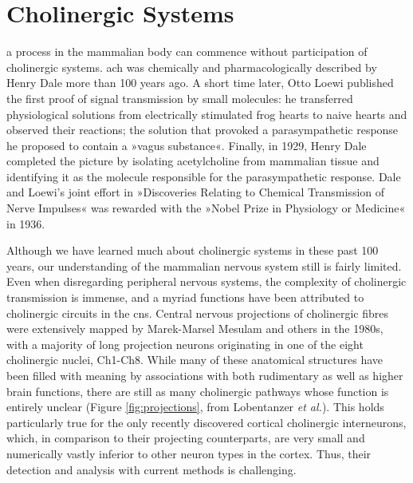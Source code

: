 \section{Cholinergic Systems}
 a process in the mammalian body can commence without participation of cholinergic systems. \Ac{ach} was chemically and pharmacologically described by Henry Dale more than 100 years ago.\cite{Dale1914} A short time later, Otto Loewi published the first proof of signal transmission by small molecules: he transferred physiological solutions from electrically stimulated frog hearts to naive hearts and observed their reactions; the solution that provoked a parasympathetic response he proposed to contain a »vagus substance«.\cite{Loewi1921} Finally, in 1929, Henry Dale completed the picture by isolating acetylcholine from mammalian tissue and identifying it as the molecule responsible for the parasympathetic response.\cite{Dale1929} Dale and Loewi's joint effort in »Discoveries Relating to Chemical Transmission of Nerve Impulses« was rewarded with the »Nobel Prize in Physiology or Medicine« in 1936.

Although we have learned much about cholinergic systems in these past 100 years, our understanding of the mammalian nervous system still is fairly limited. Even when disregarding peripheral nervous systems, the complexity of cholinergic transmission is immense, and a myriad functions have been attributed to cholinergic circuits in the \ac{cns}. Central nervous projections of cholinergic fibres were extensively mapped by Marek-Marsel Mesulam and others in the 1980s,\cite{Mesulam1984, Mesulam1988} with a majority of long projection neurons originating in one of the eight cholinergic nuclei, Ch1-Ch8. While many of these anatomical structures have been filled with meaning by associations with both rudimentary as well as higher brain functions, there are still as many cholinergic pathways whose function is entirely unclear (Figure \ref{fig:projections}, from Lobentanzer \emph{et al.}\cite{Lobentanzer2019a}). This holds particularly true for the only recently discovered cortical cholinergic interneurons, which, in comparison to their projecting counterparts, are very small and numerically vastly inferior to other neuron types in the cortex. Thus, their detection and analysis with current methods is challenging. 

